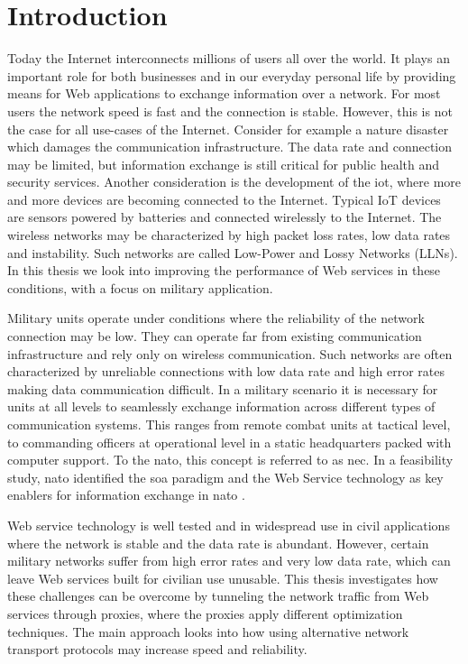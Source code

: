 
\chapter{Introduction}

Today the Internet interconnects millions of users all over the world. It plays
an important role for both businesses and in our everyday personal life by
providing means for Web applications to exchange information over a network. For
most users the network speed is fast and the connection is stable. However, this
is not the case for all use-cases of the Internet. Consider for example a nature
disaster which damages the communication infrastructure. The data rate and
connection may be limited, but information exchange is still critical for public
health and security services. Another consideration is the development of the
\gls{iot}, where more and more devices are becoming connected to the Internet.
Typical IoT devices are sensors powered by batteries and connected wirelessly to
the Internet. The wireless networks may be characterized by high packet loss
rates, low data rates and instability. Such networks are called  Low-Power and
Lossy Networks (LLNs). In this thesis we look into improving the performance of
Web services in these conditions, with a focus on military application.


Military units operate under conditions where the reliability of the network
connection may be low. They can operate far from existing communication
infrastructure and rely only on wireless communication. Such networks are often
characterized by unreliable connections with low data rate and high error rates
making data communication difficult. In a military scenario it is necessary for
units at all levels to seamlessly exchange information across different types of
communication systems. This ranges from remote combat units at tactical level,
to commanding officers at operational level in a static headquarters packed with
computer support. To the \gls{nato}, this concept is referred to as \gls{nec}.
In a feasibility study, \gls{nato} identified the \gls{soa} paradigm and the Web
Service technology as key enablers for information exchange in
\gls{nato} \cite{nnec-study}.

Web service technology is well tested and in widespread use in civil
applications where the network is stable and the data rate is abundant. However,
certain military networks suffer from high error rates and very low data rate,
which can leave Web services built for civilian use unusable. This thesis
investigates how these challenges can be overcome by tunneling the network
traffic from Web services through proxies, where the proxies apply different
optimization techniques. The main approach looks into how using alternative
network transport protocols may increase speed and reliability.

